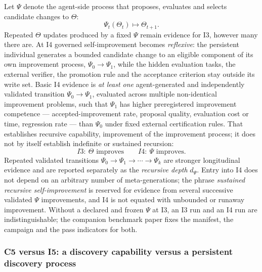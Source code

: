 Let $\Psi$ denote the agent-side process that proposes, evaluates and selects candidate changes to $\Theta$:
\begin{equation}
\Psi_t(\Theta_t) \mapsto \Theta_{t+1}.
\end{equation}
Repeated $\Theta$ updates produced by a fixed $\Psi$ remain evidence for I3, however many there are. At I4 governed self-improvement becomes \emph{reflexive}: the persistent individual generates a bounded candidate change to an eligible component of its own improvement process, $\Psi_0 \to \Psi_1$, while the hidden evaluation tasks, the external verifier, the promotion rule and the acceptance criterion stay outside its write set. Basic I4 evidence is \emph{at least one} agent-generated and independently validated transition $\Psi_0 \to \Psi_1$, evaluated across multiple non-identical improvement problems, such that $\Psi_1$ has higher preregistered improvement competence --- accepted-improvement rate, proposal quality, evaluation cost or time, regression rate --- than $\Psi_0$ under fixed external certification rules. That establishes recursive capability, improvement of the improvement process; it does not by itself establish indefinite or sustained recursion:
\begin{equation}
I3:\ \Theta \text{ improves} \qquad I4:\ \Psi \text{ improves}.
\end{equation}
Repeated validated transitions $\Psi_0 \to \Psi_1 \to \cdots \to \Psi_k$ are stronger longitudinal evidence and are reported separately as the \emph{recursive depth} $d_\Psi$. Entry into I4 does not depend on an arbitrary number of meta-generations; the phrase \emph{sustained recursive self-improvement} is reserved for evidence from several successive validated $\Psi$ improvements, and I4 is not equated with unbounded or runaway improvement. Without a declared and frozen $\Psi$ at I3, an I3 run and an I4 run are indistinguishable; the companion benchmark paper fixes the manifest, the campaign and the pass indicators for both.

\subsubsection{C5 versus I5: a discovery capability versus a persistent discovery process}

